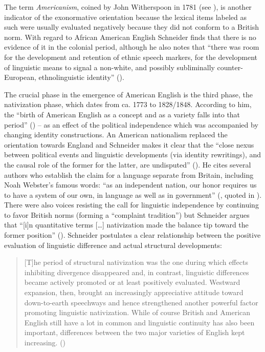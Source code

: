 The term \textit{Americanism}, coined by John Witherspoon in 1781 (see \citealt[272]{Schneider2007}), is another indicator of the exonormative orientation because the lexical items labeled as such were usually evaluated negatively because they did not conform to a British norm. With regard to African American English Schneider finds that there is no evidence of it in the colonial period, although he also notes that “there was room for the development and retention of ethnic speech markers, for the development of linguistic means to signal a non-white, and possibly subliminally counter-European, ethnolinguistic identity” (\citeyear[268]{Schneider2007}).


The crucial phase in the emergence of American English is the third phase, the nativization phase, which \citet[273]{Schneider2007} dates from ca. 1773 to 1828/1848. According to him, the “birth of American English as a concept and as a variety falls into that period” (\citeyear[276]{Schneider2007}) – as an effect of the political independence which was accompanied by changing identity constructions. An American nationalism replaced the orientation towards England and Schneider makes it clear that the “close nexus between political events and linguistic developments (via identity rewritings), and the causal role of the former for the latter, are undisputed” (\citeyear[275]{Schneider2007}). He cites several authors who establish the claim for a language separate from Britain, including Noah Webster’s famous words: “as an independent nation, our honor requires us to have a system of our own, in language as well as in government” (\citealt[20]{Webster1789}, quoted in \citealt[277]{Schneider2007}). There were also voices resisting the call for linguistic independence by continuing to favor British norms (forming a “complaint tradition”) but Schneider argues that “[i]n quantitative terms […] nativization made the balance tip toward the former position” (\citeyear[277]{Schneider2007}). Schneider postulates a clear relationship between the positive evaluation of linguistic difference and actual structural developments:

\begin{quote}
[T]he period of structural nativization was the one during which effects inhibiting divergence disappeared and, in contrast, linguistic differences became actively promoted or at least positively evaluated. Westward expansion, then, brought an increasingly appreciative attitude toward down-to-earth speechways and hence strengthened another powerful factor promoting linguistic nativization. While of course British and American English still have a lot in common and linguistic continuity has also been important, differences between the two major varieties of English kept increasing. (\citeyear[278]{Schneider2007})
\end{quote}


